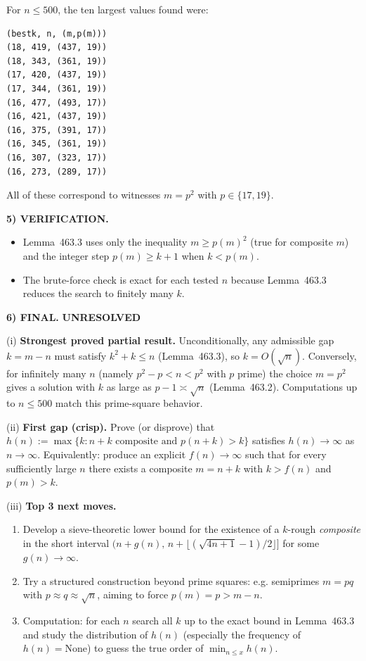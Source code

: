 For $n\le 500$, the ten largest values found were:
\begin{verbatim}
(bestk, n, (m,p(m)))
(18, 419, (437, 19))
(18, 343, (361, 19))
(17, 420, (437, 19))
(17, 344, (361, 19))
(16, 477, (493, 17))
(16, 421, (437, 19))
(16, 375, (391, 17))
(16, 345, (361, 19))
(16, 307, (323, 17))
(16, 273, (289, 17))
\end{verbatim}
All of these correspond to witnesses $m=p^2$ with $p\in\{17,19\}$.

\medskip
\noindent\textbf{5) VERIFICATION.}

\begin{itemize}
\item Lemma~463.3 uses only the inequality $m\ge p(m)^2$ (true for composite $m$) and the integer step $p(m)\ge k+1$ when $k<p(m)$.
\item The brute-force check is exact for each tested $n$ because Lemma~463.3 reduces the search to finitely many $k$.
\end{itemize}

\medskip
\noindent\textbf{6) FINAL.} \textbf{UNRESOLVED}

(i) \textbf{Strongest proved partial result.}
Unconditionally, any admissible gap $k=m-n$ must satisfy $k^2+k\le n$ (Lemma~463.3), so $k=O(\sqrt{n})$. Conversely, for infinitely many $n$ (namely $p^2-p<n<p^2$ with $p$ prime) the choice $m=p^2$ gives a solution with $k$ as large as $p-1\asymp\sqrt{n}$ (Lemma~463.2). Computations up to $n\le 500$ match this prime-square behavior.

(ii) \textbf{First gap (crisp).}
Prove (or disprove) that $h(n):=\max\{k: n+k\text{ composite and }p(n+k)>k\}$ satisfies $h(n)\to\infty$ as $n\to\infty$. Equivalently: produce an explicit $f(n)\to\infty$ such that for every sufficiently large $n$ there exists a composite $m=n+k$ with $k>f(n)$ and $p(m)>k$.

(iii) \textbf{Top 3 next moves.}
\begin{enumerate}
\item Develop a sieve-theoretic lower bound for the existence of a $k$-rough \emph{composite} in the short interval $(n+g(n),\,n+\lfloor(\sqrt{4n+1}-1)/2\rfloor]$ for some $g(n)\to\infty$.
\item Try a structured construction beyond prime squares: e.g. semiprimes $m=pq$ with $p\approx q\approx \sqrt{n}$, aiming to force $p(m)=p>m-n$.
\item Computation: for each $n$ search all $k$ up to the exact bound in Lemma~463.3 and study the distribution of $h(n)$ (especially the frequency of $h(n)=\text{None}$) to guess the true order of $\min_{n\le x} h(n)$.
\end{enumerate}

